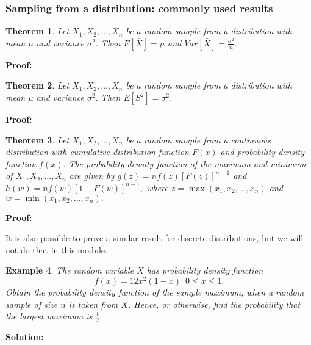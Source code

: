 \documentclass[12pt]{article}
\theoremstyle{break}
\newtheorem{theorem}{Theorem}[section]
\newtheorem{example}[theorem]{Example}
\begin{document}
\subsubsection{Sampling from a distribution: commonly used results}
\begin{theorem}
Let $X_{1},X_{2},\ldots,X_{n}$ be a random sample from a distribution with mean $\mu$ and variance $\sigma^2$. Then $\displaystyle E[\bar{X}]=\mu$ and $\displaystyle Var[\bar{X}]=\frac{\sigma^2}{n}.$
\end{theorem}
\begin{mdframed}
{\bf Proof:}
\textcolor[rgb]{1.00,1.00,1.00}{\lipsum[1-3]}
\end{mdframed}

\begin{theorem}
Let $X_{1},X_{2},\ldots,X_{n}$ be a random sample from a distribution with mean $\mu$ and variance $\sigma^2$. Then $\displaystyle E[S^{2}]=\sigma^2$.
\end{theorem}
\begin{mdframed}
{\bf Proof:}
\textcolor[rgb]{1.00,1.00,1.00}{\lipsum[1-3]}
\end{mdframed}

\begin{theorem}
Let $X_{1},X_{2},\ldots,X_{n}$ be a random sample from a continuous distribution with cumulative distribution function $F(x)$ and probability density function $f(x).$ The probability density function of the maximum and minimum of $X_{1},X_{2},\ldots,X_{n}$ are given by $\displaystyle g(z)=nf(z)[F(z)]^{n-1}$ and $\displaystyle h(w)=nf(w)[1-F(w)]^{n-1},$ where $z=\max(x_{1},x_{2},\ldots,x_{n})$ and $w=\min(x_{1},x_{2},\ldots,x_{n}).$
\end{theorem}
\begin{mdframed}
{\bf Proof:}
\textcolor[rgb]{1.00,1.00,1.00}{\lipsum[1-8]}
\end{mdframed}
It is also possible to prove a similar result for discrete distributions, but we will not do that in this module.
\begin{example}
The random variable $X$ has probability density function
$$f(x)=12x^{2}(1-x)\,\,\, 0\leq x \leq 1.$$ Obtain the probability density function of the sample maximum, when a random sample of size $n$ is taken from $X$. Hence, or otherwise, find the probability that the largest maximum is $\frac{1}{2}.$
\end{example}
\begin{mdframed}
{\bf Solution:}
\textcolor[rgb]{1.00,1.00,1.00}{\lipsum[1-7]}
\end{mdframed}
\end{document}
